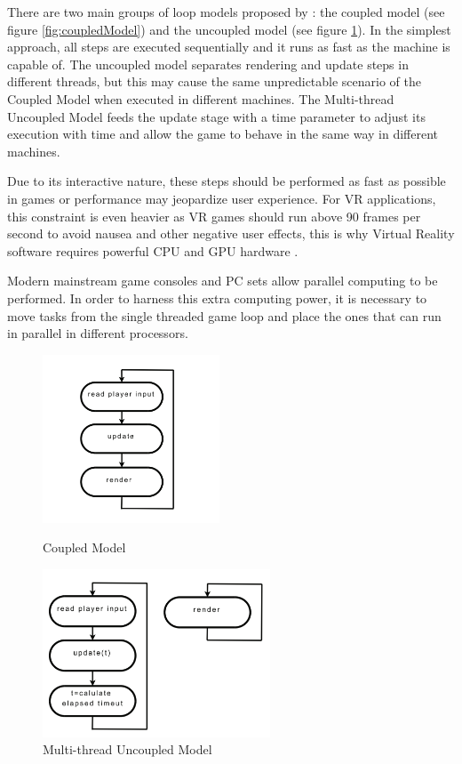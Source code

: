 \documentclass[runningheads]{llncs}
\begin{document}
There are two main groups of loop models proposed by \cite{valente_conci_feijo}: the coupled model (see figure \ref{fig:coupledModel}) and the uncoupled model (see figure \ref{fig:uncoupledModel}).
In the simplest approach, all steps are executed sequentially and it runs as fast as the machine is capable of. The uncoupled model separates rendering and update steps in different threads, but this may cause the same unpredictable scenario of the Coupled Model when executed in different machines. The Multi-thread Uncoupled Model feeds the update stage with a time parameter to adjust its execution with time and allow the game to behave in the same way in different machines.  

Due to its interactive nature, these steps should be performed as fast as possible in games or performance may jeopardize user experience. For VR applications, this constraint is even heavier as VR games should run above 90 frames per second to avoid nausea and other negative user effects, this is why Virtual Reality software requires powerful CPU and GPU hardware \cite{gregory_2019}. 

Modern mainstream game consoles and PC sets allow parallel computing to be performed. In order to harness this extra computing power, it is necessary to move tasks from the single threaded game loop and place the ones that can run in parallel in different processors. 

\begin{figure}
    \centering
    \begin{minipage}{.5\textwidth}
        \centering
        \includegraphics[width=\linewidth,height=5cm]{src/hci2020-images/CoupledGameLoop.png}
        \caption{Coupled Model}
        \label{fig:coupledModel}
    \end{minipage}%
    \begin{minipage}{.5\textwidth}
        \centering
        \includegraphics[width=\linewidth,height=5cm]{src/hci2020-images/UncoupledGameLoop.png}
        \caption{Multi-thread Uncoupled Model}
        \label{fig:uncoupledModel}
    \end{minipage}
\end{figure}
\end{document}

